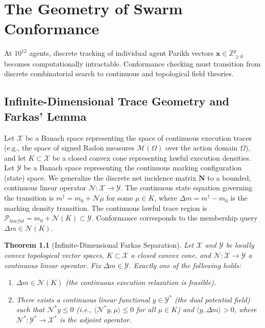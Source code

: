 \documentclass[11pt,oneside]{book}
\theoremstyle{definition}
\theoremstyle{plain}
\newtheorem{theorem}{Theorem}[chapter]
\theoremstyle{remark}
\begin{document}
\chapter{The Geometry of Swarm Conformance}
\label{ch:geometry}

At $10^{12}$ agents, discrete tracking of individual agent Parikh vectors $\bm{x} \in \mathbb{Z}_{\ge 0}^p$ becomes computationally intractable. %
Conformance checking must transition from discrete combinatorial search to continuous and topological field theories. %

\section{Infinite-Dimensional Trace Geometry and Farkas' Lemma}
Let $\mathcal{X}$ be a Banach space representing the space of continuous execution traces (e.g., the space of signed Radon measures $\mathcal{M}(\Omega)$ over the action domain $\Omega$), and let $K \subset \mathcal{X}$ be a closed convex cone representing lawful execution densities. %
Let $\mathcal{Y}$ be a Banach space representing the continuous marking configuration (state) space. %
We generalize the discrete net incidence matrix $\mathbf{N}$ to a bounded, continuous linear operator $\mathcal{N}: \mathcal{X} \to \mathcal{Y}$. %
The continuous state equation governing the transition is $m^\dagger = m_0 + \mathcal{N}\mu$ for some $\mu \in K$, where $\Delta m = m^\dagger - m_0$ is the marking density transition. %
The continuous lawful trace region is $\mathcal{P}_{lawful} = m_0 + \mathcal{N}(K) \subset \mathcal{Y}$. %
Conformance corresponds to the membership query $\Delta m \in \overline{\mathcal{N}(K)}$. %

\begin{theorem}[Infinite-Dimensional Farkas Separation]\label{thm:farkas_sep}
Let $\mathcal{X}$ and $\mathcal{Y}$ be locally convex topological vector spaces, $K \subset \mathcal{X}$ a closed convex cone, and $\mathcal{N}: \mathcal{X} \to \mathcal{Y}$ a continuous linear operator. %
Fix $\Delta m \in \mathcal{Y}$. %
Exactly one of the following holds:
\begin{enumerate}
\item $\Delta m \in \overline{\mathcal{N}(K)}$ (the continuous execution relaxation is feasible). %
\item There exists a continuous linear functional $y \in \mathcal{Y}^*$ (the dual potential field) such that $\mathcal{N}^* y \le 0$ (i.e., $\langle \mathcal{N}^* y, \mu \rangle \le 0$ for all $\mu \in K$) and $\langle y, \Delta m \rangle > 0$, where $\mathcal{N}^*: \mathcal{Y}^* \to \mathcal{X}^*$ is the adjoint operator. %
\end{enumerate}
\end{theorem}
\end{document}
